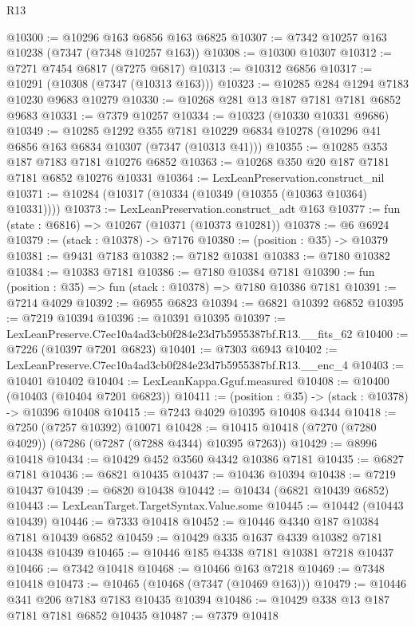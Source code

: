 \begin{lexlean}{R13}
\begin{coremodule}
@10300 := @10296 @163 @6856 @163 @6825
@10307 := @7342 @10257 @163 @10238 (@7347 (@7348 @10257 @163))
@10308 := @10300 @10307
@10312 := @7271 @7454 @6817 (@7275 @6817)
@10313 := @10312 @6856
@10317 := @10291 (@10308 (@7347 (@10313 @163)))
@10323 := @10285 @284 @1294 @7183 @10230 @9683 @10279
@10330 := @10268 @281 @13 @187 @7181 @7181 @6852 @9683
@10331 := @7379 @10257
@10334 := @10323 (@10330 @10331 @9686)
@10349 := @10285
    @1292
    @355
    @7181
    @10229
    @6834
    @10278
    (@10296 @41 @6856 @163 @6834 @10307 (@7347 (@10313 @41)))
@10355 := @10285 @353 @187 @7183 @7181 @10276 @6852
@10363 := @10268 @350 @20 @187 @7181 @7181 @6852 @10276 @10331
@10364 := LexLeanPreservation.construct_nil
@10371 := @10284 (@10317 (@10334 (@10349 (@10355 (@10363 @10364) @10331))))
@10373 := LexLeanPreservation.construct_adt @163
@10377 := fun (state : @6816) => @10267 (@10371 (@10373 @10281))
@10378 := @6 @6924
@10379 := (stack : @10378) -> @7176
@10380 := (position : @35) -> @10379
@10381 := @9431 @7183
@10382 := @7182 @10381
@10383 := @7180 @10382
@10384 := @10383 @7181
@10386 := @7180 @10384 @7181
@10390 := fun (position : @35) => fun (stack : @10378) => @7180 @10386 @7181
@10391 := @7214 @4029
@10392 := @6955 @6823
@10394 := @6821 @10392 @6852
@10395 := @7219 @10394
@10396 := @10391 @10395
@10397 := LexLeanPreserve.C7ec10a4ad3cb0f284e23d7b5955387bf.R13.__fits_62
@10400 := @7226 (@10397 @7201 @6823)
@10401 := @7303 @6943
@10402 := LexLeanPreserve.C7ec10a4ad3cb0f284e23d7b5955387bf.R13.__enc_4
@10403 := @10401 @10402
@10404 := LexLeanKappa.Gguf.measured
@10408 := @10400 (@10403 (@10404 @7201 @6823))
@10411 := (position : @35) -> (stack : @10378) -> @10396 @10408
@10415 := @7243 @4029 @10395 @10408 @4344
@10418 := @7250 (@7257 @10392) @10071
@10428 := @10415 @10418 (@7270 (@7280 @4029)) (@7286 (@7287 (@7288 @4344) @10395 @7263))
@10429 := @8996 @10418
@10434 := @10429 @452 @3560 @4342 @10386 @7181
@10435 := @6827 @7181
@10436 := @6821 @10435
@10437 := @10436 @10394
@10438 := @7219 @10437
@10439 := @6820 @10438
@10442 := @10434 (@6821 @10439 @6852)
@10443 := LexLeanTarget.TargetSyntax.Value.some
@10445 := @10442 (@10443 @10439)
@10446 := @7333 @10418
@10452 := @10446 @4340 @187 @10384 @7181 @10439 @6852
@10459 := @10429 @335 @1637 @4339 @10382 @7181 @10438 @10439
@10465 := @10446 @185 @4338 @7181 @10381 @7218 @10437
@10466 := @7342 @10418
@10468 := @10466 @163 @7218
@10469 := @7348 @10418
@10473 := @10465 (@10468 (@7347 (@10469 @163)))
@10479 := @10446 @341 @206 @7183 @7183 @10435 @10394
@10486 := @10429 @338 @13 @187 @7181 @7181 @6852 @10435
@10487 := @7379 @10418

\end{coremodule}
\end{lexlean}
